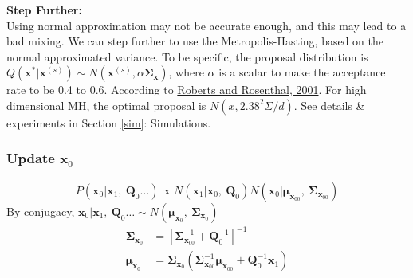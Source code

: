 \documentclass[]{article}
\begin{document}
\textbf{Step Further:}\\
Using normal approximation may not be accurate enough, and this may lead to a bad mixing. We can step further to use the Metropolis-Hasting, based on the normal approximated variance. To be specific, the proposal distribution is \(Q(\mathbf{x}^{*}|\mathbf{x}^{(s)}) \sim N(\mathbf{x}^{(s)}, \alpha\mathbf{\Sigma}_{\mathbf{x}})\), where \(\alpha\) is a scalar to make the acceptance rate to be 0.4 to 0.6. According to \href{https://projecteuclid.org/journals/statistical-science/volume-16/issue-4/Optimal-scaling-for-various-Metropolis-Hastings-algorithms/10.1214/ss/1015346320.full}{Roberts and Rosenthal, 2001}. For high dimensional MH, the optimal proposal is \(N(x, 2.38^2\Sigma/d)\). See details \& experiments in Section \ref{sim}: Simulations.


\subsubsection{Update \(\mathbf{x}_{0}\)}
\[P\left( \mathbf{x}_{0}|\mathbf{x}_{1},\ \mathbf{Q}_{0}\ldots \right) \propto N(\mathbf{x}_{1}|\mathbf{x}_{0},\ \mathbf{Q}_{0})N(\mathbf{x}_{0}|\bm{\mu}_{\mathbf{x}_{00}},\ \mathbf{\Sigma}_{\mathbf{x}_{00}})\]
By conjugacy, \(\mathbf{x}_{0}|\mathbf{x}_{1},\ \mathbf{Q}_{0}\ldots \sim N(\bm{\mu}_{\mathbf{x}_{0}},\ \mathbf{\Sigma}_{\mathbf{x}_{0}})\)
\begin{align*}
	\mathbf{\Sigma}_{\mathbf{x}_{0}} &= \left\lbrack \mathbf{\Sigma}_{\mathbf{x}_{00}}^{- 1} + \mathbf{Q}_{0}^{- 1} \right\rbrack^{- 1}\\
	\bm{\mu}_{\mathbf{x}_{0}} &= \mathbf{\Sigma}_{\mathbf{x}_{0}}\left( \mathbf{\Sigma}_{\mathbf{x}_{00}}^{- 1}\bm{\mu}_{\mathbf{x}_{00}} + \mathbf{Q}_{0}^{- 1}\mathbf{x}_{1} \right)
\end{align*}
\end{document}
